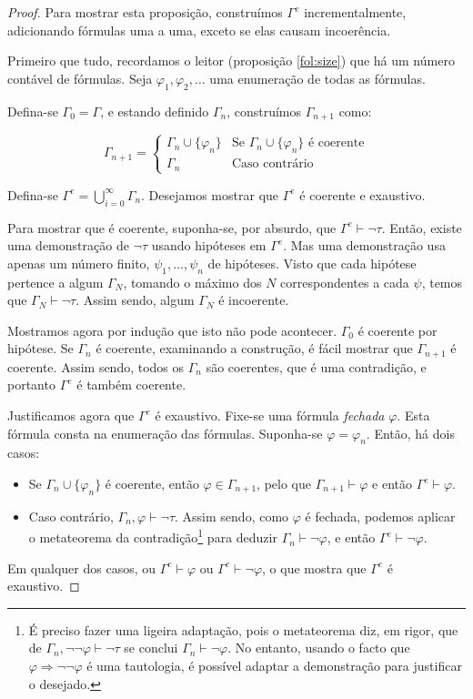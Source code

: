 \documentclass{report}
\theoremstyle{definition}
\theoremstyle{remark}
\newcommand{\imply}{\mathbin{\Rightarrow}}
\begin{document}
	\begin{proof}
	Para mostrar esta proposição, construímos $\Gamma^e$ incrementalmente, adicionando fórmulas uma a uma, exceto se elas causam incoerência.
	
	Primeiro que tudo, recordamos o leitor (proposição \ref{fol:size}) que há um número contável de fórmulas. Seja $\varphi_1, \varphi_2, \dots$ uma enumeração de todas as fórmulas.
	
	Defina-se $\Gamma_0 = \Gamma$, e estando definido $\Gamma_n$, construímos $\Gamma_{n+1}$ como:
	
	\[\Gamma_{n+1} = \begin{cases}
	\Gamma_n \cup \{\varphi_n\}&\text{Se $\Gamma_n \cup \{\varphi_n\}$ é coerente}\\
	\Gamma_n&\text{Caso contrário}
	\end{cases}\]
	
	Defina-se $\Gamma^e = \bigcup_{i=0}^\infty \Gamma_n$. Desejamos mostrar que $\Gamma^e$ é coerente e exaustivo.
	
	Para mostrar que é coerente, suponha-se, por absurdo, que $\Gamma^e \vdash \neg \tau$. Então, existe uma demonstração de $\neg \tau$ usando hipóteses em $\Gamma^e$. Mas uma demonstração usa apenas um número finito, $\psi_1, \dots, \psi_n$ de hipóteses. Visto que cada hipótese pertence a algum $\Gamma_N$, tomando o máximo dos $N$ correspondentes a cada $\psi$, temos que $\Gamma_N \vdash \neg \tau$. Assim sendo, algum $\Gamma_N$ é incoerente.
	
	Mostramos agora por indução que isto não pode acontecer. $\Gamma_0$ é coerente por hipótese. Se $\Gamma_n$ é coerente, examinando a construção, é fácil mostrar que $\Gamma_{n+1}$ é coerente. Assim sendo, todos os $\Gamma_n$ são coerentes, que é uma contradição, e portanto $\Gamma^e$ é também coerente.
	
	Justificamos agora que $\Gamma^e$ é exaustivo. Fixe-se uma fórmula \emph{fechada} $\varphi$. Esta fórmula consta na enumeração das fórmulas. Suponha-se $\varphi = \varphi_n$. Então, há dois casos:
	
	\begin{itemize}
	\item Se $\Gamma_n \cup \{\varphi_n\}$ é coerente, então $\varphi \in \Gamma_{n+1}$, pelo que $\Gamma_{n+1} \vdash \varphi$ e então $\Gamma^e \vdash \varphi$.
	
	\item Caso contrário, $\Gamma_n, \varphi \vdash \neg \tau$. Assim sendo, como $\varphi$ é fechada, podemos aplicar o metateorema da contradição\footnote{É preciso fazer uma ligeira adaptação, pois o metateorema diz, em rigor, que de $\Gamma_n, \neg \neg \varphi \vdash \neg \tau$ se conclui $\Gamma_n \vdash \neg \varphi$. No entanto, usando o facto que $\varphi \imply \neg \neg \varphi$ é uma tautologia, é possível adaptar a demonstração para justificar o desejado.} para deduzir $\Gamma_n \vdash \neg \varphi$, e então $\Gamma^e \vdash \neg \varphi$.
	\end{itemize}
	
	Em qualquer dos casos, ou $\Gamma^e \vdash \varphi$ ou $\Gamma^e \vdash \neg \varphi$, o que mostra que $\Gamma^e$ é exaustivo.
	\end{proof}
	
\end{document}
